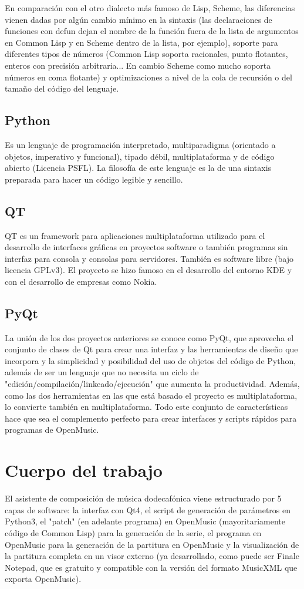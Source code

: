 \documentclass[a4paper,openright,12pt]{book}
\begin{document}
En comparación con el otro dialecto más famoso de Lisp, Scheme, las diferencias vienen dadas por algún cambio mínimo en la sintaxis (las declaraciones de funciones con defun dejan el nombre de la función fuera de la lista de argumentos en Common Lisp y en Scheme dentro de la lista, por ejemplo), soporte para diferentes tipos de números (Common Lisp soporta racionales, punto flotantes, enteros con precisión arbitraria... En cambio Scheme como mucho soporta números en coma flotante) y optimizaciones a nivel de la cola de recursión o del tamaño del código del lenguaje.

\section{Python}
Es un lenguaje de programación interpretado, multiparadigma (orientado a objetos, imperativo y funcional), tipado débil, multiplataforma y de código abierto (Licencia PSFL). La filosofía de este lenguaje es la de una sintaxis preparada para hacer un código legible y sencillo.

\section{QT}
QT es un framework para aplicaciones multiplataforma utilizado para el desarrollo de interfaces gráficas en proyectos software o también programas sin interfaz para consola y consolas para servidores. También es software libre (bajo licencia GPLv3). El proyecto se hizo famoso en el desarrollo del entorno KDE y con el desarrollo de empresas como Nokia.

\section{PyQt}
La unión de los dos proyectos anteriores se conoce como PyQt, que aprovecha el conjunto de clases de Qt para crear una interfaz y las herramientas de diseño que incorpora y la simplicidad y posibilidad del uso de objetos del código de Python, además de ser un lenguaje que no necesita un ciclo de "edición/compilación/linkeado/ejecución" que aumenta la productividad. Además, como las dos herramientas en las que está basado el proyecto es multiplataforma, lo convierte también en multiplataforma. Todo este conjunto de características hace que sea el complemento perfecto para crear interfaces y scripts rápidos para programas de OpenMusic.

\chapter{Cuerpo del trabajo}\label{cuerpo}
El asistente de composición de música dodecafónica viene estructurado por 5 capas de software: la interfaz con Qt4, el script de generación de parámetros en Python3, el "patch" (en adelante programa) en OpenMusic (mayoritariamente código de Common Lisp) para la generación de la serie, el programa en OpenMusic para la generación de la partitura en OpenMusic y la visualización de la partitura completa en un visor externo (ya desarrollado, como puede ser Finale Notepad, que es gratuito y compatible con la versión del formato MusicXML que exporta OpenMusic).
\end{document}
